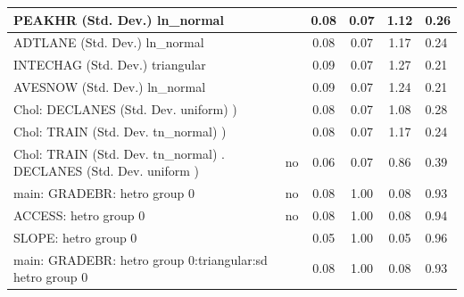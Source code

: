 \begin{table}
\begin{center}
\begin{tabular}{|l|l|c|c|c|l|}
			\hline
			PEAKHR (Std. Dev.) ln_normal &  & 0.08 & 0.07 & 1.12 & 0.26 \\
			\hline
			ADTLANE (Std. Dev.) ln_normal &  & 0.08 & 0.07 & 1.17 & 0.24 \\
			\hline
			INTECHAG (Std. Dev.) triangular &  & 0.09 & 0.07 & 1.27 & 0.21 \\
			\hline
			AVESNOW (Std. Dev.) ln_normal &  & 0.09 & 0.07 & 1.24 & 0.21 \\
			\hline
			 Chol: DECLANES (Std. Dev. uniform) ) &  & 0.08 & 0.07 & 1.08 & 0.28 \\
			\hline
			 Chol: TRAIN (Std. Dev. tn_normal) ) &  & 0.08 & 0.07 & 1.17 & 0.24 \\
			\hline
			 Chol: TRAIN (Std. Dev. tn_normal) . DECLANES (Std. Dev.   uniform ) & no & 0.06 & 0.07 & 0.86 & 0.39 \\
			\hline
			main: GRADEBR: hetro group 0 & no & 0.08 & 1.00 & 0.08 & 0.93 \\
			\hline
			ACCESS: hetro group 0 & no & 0.08 & 1.00 & 0.08 & 0.94 \\
			\hline
			SLOPE: hetro group 0 &  & 0.05 & 1.00 & 0.05 & 0.96 \\
			\hline
			main: GRADEBR: hetro group 0:triangular:sd  hetro group 0 &  & 0.08 & 1.00 & 0.08 & 0.93 \\
			\hline
		\end{tabular}
	\end{center}
\end{table}